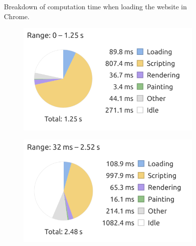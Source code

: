 \documentclass[a4paper]{article}
\begin{document}
\begin{figure}[h!]
    \caption{Breakdown of computation time when loading the website in Chrome.}
    \label{fig:hastings-performance}
\end{figure}


\begin{figure}[h!]
    \centering
    \begin{subfigure}{0.49\textwidth}
        \includegraphics[width=\textwidth]{figure/clientsidePerformance/graph1.png}
    \end{subfigure}
    \begin{subfigure}{0.49\textwidth}
        \includegraphics[width=\textwidth]{figure/clientsidePerformance/braseegraph1.png}
    \end{subfigure}
    \\
    \begin{subfigure}{0.5\textwidth}

\end{subfigure}
\end{figure}
\end{document}
